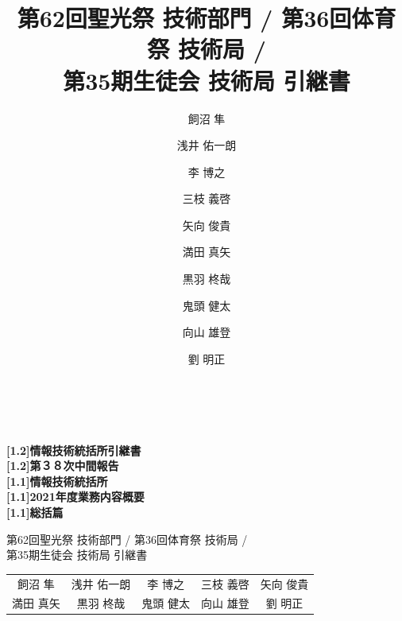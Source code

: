 \documentclass[a4paper]{ltjsreport}
\title{第62回聖光祭 技術部門 / 第36回体育祭 技術局 /\\ 第35期生徒会 技術局 引継書}
\author{飼沼 隼\and 浅井 佑一朗\and 李 博之\and 三枝 義啓\and 矢向 俊貴\and 満田 真矢\and 黒羽 柊哉\and 鬼頭 健太\and 向山 雄登\and 劉 明正}
\begin{document}
\thispagestyle{empty}
\addtocounter{page}{-1}
\begin{center}

  \textbf {
    \vspace{8.1cm}
    \\
    \fboxrule
    \\
    \vspace{1mm}
    \fontsize{55pt}{60pt}\selectfont \scalebox{0.8}[1.2]{情報技術統括所引継書}\\
    \vspace{1mm}
    \fontsize{34pt}{50pt}\selectfont \scalebox{0.8}[1.2]{第３８次中間報告}\\
    \vspace{1mm}
  }
  \textbf {
    \fontsize{13pt}{29pt}\selectfont \scalebox{0.9}[1.1]{情報技術統括所}\\
    \fontsize{13pt}{15pt}\selectfont \scalebox{0.9}[1.1]{2021年度業務内容概要}\\
    \fontsize{13pt}{18pt}\selectfont \scalebox{0.9}[1.1]{総括篇}\\
  }
\end{center}

\newpage
\vspace{2cm}
\begin{center}
  {\Large 第62回聖光祭 技術部門 / 第36回体育祭 技術局 /\\ 第35期生徒会 技術局 引継書}\\
\end{center}
\vspace{3cm}
\begin{center}
  \begin{tabular}{ccccc}
    飼沼 隼  & 浅井 佑一朗 & 李 博之  & 三枝 義啓 & 矢向 俊貴 \\
    満田 真矢 & 黒羽 柊哉  & 鬼頭 健太 & 向山 雄登 & 劉 明正
  \end{tabular}
\end{center}


\newpage
\thispagestyle{fancy}
\twocolumn
\setcounter{tocdepth}{4}
\hypertarget{top}{\tableofcontents}

\onecolumn
\end{document}

